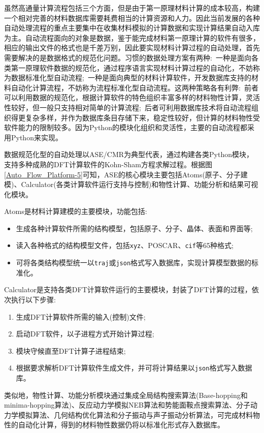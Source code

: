 虽然高通量计算流程包括三个方面，但是由于第一原理材料计算的成本较高，构建一个相对完善的材料数据库需要耗费相当的计算资源和人力。因此当前发展的各种自动处理流程的重点主要集中在收集材料模拟的计算数据和实现计算结果自动入库为主。自动流程面向的对象是数据，鉴于能完成材料第一原理计算的软件有很多，相应的输出文件的格式也是千差万别，因此要实现材料计算过程的自动处理，首先需要解决的是数据格式的规范化问题。习惯的数据处理方案有两种:~一种是面向各类第一原理软件数据的规范化，通过程序语言实现材料计算过程的自动化，不妨称为数据标准化型自动流程;~一种是面向典型的材料计算软件，开发数据库支持的材料自动化计算流程，不妨称为流程标准化型自动流程。这两种策略各有利弊:~前者可以利用数据的规范化，根据计算软件的特色组织丰富多样的材料物性计算，灵活性较好，但一般只支持相对简单的计算流程;~后者可利用数据库技术将自动流程组织得更复杂多样，并作为数据库条目存储下来，稳定性较好，但计算的材料物性受软件能力的限制较多。因为\textrm{Python}\cite{Python_URL}的模块化组织和灵活性，主要的自动流程都采用\textrm{Python}来实现。

数据规范化型的自动处理以\textrm{ASE/CMR}为典型代表，通过构建各类\textrm{Python}模块，支持多种成熟的\textrm{DFT}计算软件的\textrm{Kohn-Sham}方程求解过程。根据图\ref{Auto_Flow_Platform-5}可知，\textrm{ASE}的核心模块主要包括\textrm{Atoms}(原子、分子建模)、\textrm{Calculator}(各类计算软件运行支持与控制)和物性计算、功能分析和结果可视化模块。

\textrm{Atoms}是材料计算建模的主要模块，功能包括:
\begin{itemize}
	\item 生成各种计算软件所需的结构模型，包括原子、分子、晶体、表面和界面等;
	\item 读入各种格式的结构模型文件，包括\texttt{xyz}、\textrm{POSCAR}、\texttt{cif}等65种格式;
	\item 可将各类结构模型统一以\texttt{traj}或\texttt{json}格式写入数据库，实现计算模型数据的标准化。
\end{itemize}

\textrm{Calculator}是支持各类\textrm{DFT}计算软件运行的主要模块，封装了\textrm{DFT}计算的过程，依次执行以下步骤:
\begin{enumerate}
	\item 生成\textrm{DFT}计算软件所需的输入(控制)文件;
	\item 启动\textrm{DFT}软件，以子进程方式开始计算过程;
	\item 模块守候直至\textrm{DFT}计算子进程结束;
	\item 根据要求解析\textrm{DFT}计算软件生成文件，并可将计算结果以\texttt{json}格式写入数据库。
\end{enumerate}
类似地，物性计算、功能分析模块通过集成全局结构搜索算法(\textrm{Base-hopping}和\textrm{minima-hopping}算法)、反应动力学模拟\textrm{NEB}算法和势能面鞍点搜索算法、分子动力学模拟算法、几何结构优化算法和分子振动与声子振动分析算法，可完成材料物性的自动化计算，得到的材料物性数据仍将以标准化形式存入数据库。


